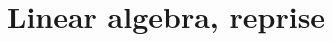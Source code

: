 \documentclass[../master.tex]{subfiles}
\begin{document}
\chapter{Linear algebra, reprise}

\end{document}
